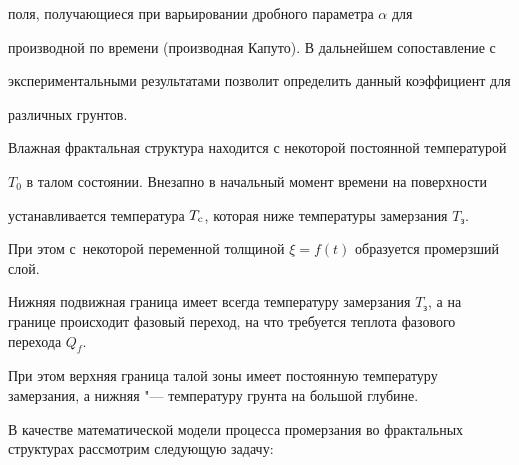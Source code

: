 поля, получающиеся при варьировании дробного параметра $\alpha$ для 

производной по времени (производная Капуто). В дальнейшем сопоставление с 

экспериментальными результатами позволит определить данный коэффициент для 

различных грунтов. 



\smallskip




Влажная фрактальная структура находится с некоторой постоянной температурой 

$T_0 $ в талом состоянии. Внезапно в начальный момент времени на поверхности 

устанавливается температура $T_{\rm c}$, которая ниже температуры замерзания $T_{\text{з}}$. 

При этом с~некоторой переменной толщиной $\xi =f(t)$ образуется  промерзший слой. 

Нижняя подвижная граница имеет всегда температуру  замерзания $T_{\text{з}}$, а на границе происходит фазовый переход, на что требуется  теплота фазового перехода $Q_f$. 

При этом верхняя граница талой зоны имеет постоянную температуру замерзания, а нижняя "--- температуру грунта на большой глубине.



В качестве математической модели процесса промерзания во фрактальных структурах рассмотрим следующую задачу:

